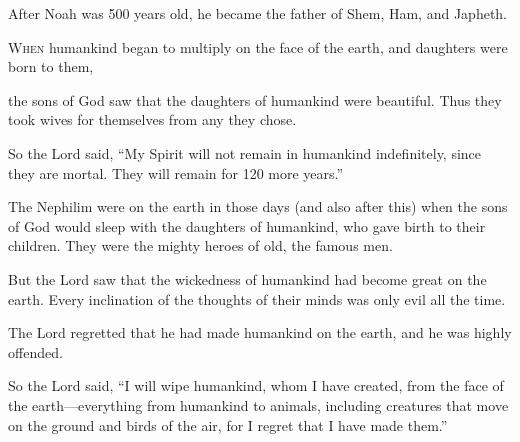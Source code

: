 \begin{scripture}
 After Noah was 500 years old, he became the father of Shem, Ham, and Japheth.

 \allowchapbreak\hypertarget{ch-genesis-6}{}\lettrine[lines=5]{\color{pentateuch}W}{\textsc{hen}} humankind began to multiply on the face of the earth, and daughters were born to them,\everypar{}
 the sons of God saw that the daughters of humankind were beautiful. Thus they took wives for themselves from any they chose.
 So the Lord said, ``My Spirit will not remain in humankind indefinitely, since they are mortal. They will remain for 120 more years.''
\everypar{}

 The Nephilim were on the earth in those days (and also after this) when the sons of God would sleep with the daughters of humankind, who gave birth to their children. They were the mighty heroes of old, the famous men.
\everypar{}

 But the Lord saw that the wickedness of humankind had become great on the earth. Every inclination of the thoughts of their minds was only evil all the time.
 The Lord regretted that he had made humankind on the earth, and he was highly offended.
 So the Lord said, ``I will wipe humankind, whom I have created, from the face of the earth---everything from humankind to animals, including creatures that move on the ground and birds of the air, for I regret that I have made them.''
\everypar{}


\end{scripture}
